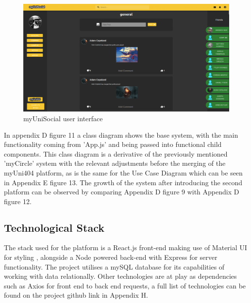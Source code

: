 \documentclass[lettersize,journal]{IEEEtran}
\begin{document}
	 \begin{figure}[h!]
                \includegraphics[width=\linewidth]{images/myunisocial.PNG}
                \caption{myUniSocial user interface}
                \label{figure 2}
        \end{figure}


        In appendix D figure 11 a class diagram shows the base system, with the main functionality coming from 'App.js' and being passed into
        functional child components. This class diagram is a derivative of the previously mentioned 'myCircle' system with the relevant adjustments before the merging of the myUni404 platform,
        as is the same for the Use Case Diagram which can be seen in Appendix E figure 13. The growth of the system after introducing the second platform can be observed by comparing Appendix D figure 9
	 with Appendix D figure 12.

        \subsection{Technological Stack}
        The stack used for the platform is a React.js front-end \cite{React} making use of Material UI for styling \cite{Mui}, alongside a Node powered back-end \cite{Node} with Express for server
    functionality\cite{Express}. The project utilises a mySQL database for its capabilities of working with data relationally. Other technologies are at play as dependencies such as Axios for front end to
     back end requests, a full list of technologies can be found on the project github link in Appendix H.
\end{document}

